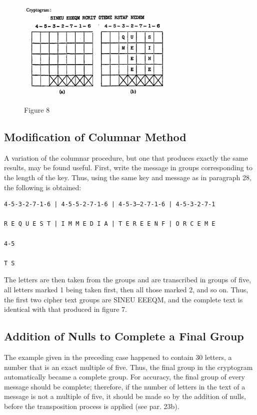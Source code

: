 \begin{figure}[h]
  \centering
    \includegraphics[width=0.7\textwidth,natwidth=445,natheight=275]{Chapter2_Figure8.png}
    \label{fig:Figure 8}
    \caption{Figure 8}
\end{figure}

\subsection{Modification of Columnar Method}

A variation of the columnar procedure, but one that produces exactly
the same results, may be found useful. First, write the message in groups
corresponding to the length of the key. Thus, using the same key and
message as in paragraph 28, the following is obtained:

\begin{verbatim}
4-5-3-2-7-1-6 | 4-5-5-2-7-1-6 | 4-5-3—2-7-1-6 | 4-5-3-2-7-1

R E Q U E S T | I M M E D I A | T E R E E N F | O R C E M E

4-5

T S
\end{verbatim}

The letters are then taken from the groups and are transcribed in groups
of five, all letters marked 1 being taken first, then all those marked 2, and
so on. Thus, the first two cipher text groups are SINEU EEEQM,
and the complete text is identical with that produced in figure 7.

\subsection{Addition of Nulls to Complete a Final Group}

The example given in the preceding case happened to contain 30 letters,
a number that is an exact multiple of five. Thus, the final group in the
cryptogram automatically became a complete group. For accuracy, the
final group of every message should be complete; therefore, if the number of letters in the text of a message is not a multiple of five, it should
be made so by the addition of nulls, before the transposition process
is applied (see par. 23b).

